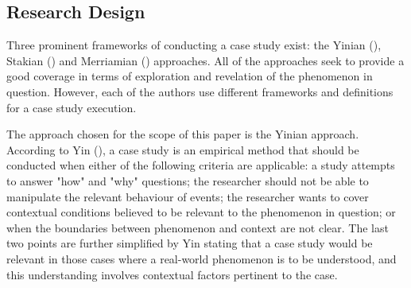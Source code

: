 \documentclass[11pt,a4paper]{article}
\begin{document}
{{%



\subsection{Research Design}
\vspace{-1mm}
\par
Three prominent frameworks of conducting a case study exist: the Yinian (\citeyear{yinCaseStudyResearch2017}), Stakian (\citeyear{stakeArtCaseStudy1995}) and Merriamian (\citeyear{merriamQualitativeResearchCase1998}) approaches. All of the approaches seek to provide a good coverage in terms of exploration and revelation of the phenomenon in question. However, each of the authors use different frameworks and definitions for a case study execution. \par 
The approach chosen for the scope of this paper is the Yinian approach. According to Yin (\citeyear{yinCaseStudyResearch2017}), a case study is an empirical method that should be conducted when either of the following criteria are applicable: a study attempts to answer "how" and "why" questions; the researcher should not be able to manipulate the relevant behaviour of events; the researcher wants to cover contextual conditions believed to be relevant to the phenomenon in question; or when the boundaries between phenomenon and context are not clear. The last two points are further simplified by Yin stating that a case study would be relevant in those cases where a real-world phenomenon is to be understood, and this understanding involves contextual factors pertinent to the case. \par
}}
\end{document}
